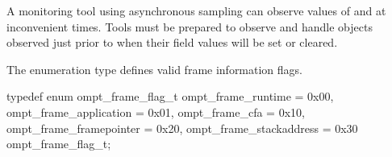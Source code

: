 %
%
%
%

\begin{note}
A monitoring tool using asynchronous sampling can observe values
of  and  at inconvenient times.
Tools must be prepared to observe and handle 
objects observed just prior to when their field values will be set or
cleared.
\end{note}


\summary
The  enumeration type defines valid frame information
flags.

\syntax
\begin{ccppspecific}
\begin{ompSyntax}
typedef enum ompt_frame_flag_t {
  ompt_frame_runtime        = 0x00,
  ompt_frame_application    = 0x01,
  ompt_frame_cfa            = 0x10,
  ompt_frame_framepointer   = 0x20,
  ompt_frame_stackaddress   = 0x30
} ompt_frame_flag_t; 
\end{ompSyntax}
\end{ccppspecific}

